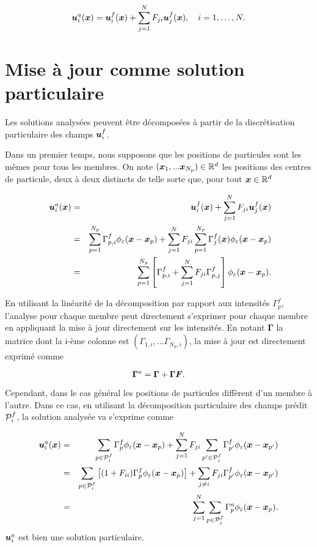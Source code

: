 \begin{equation}
    \bm{u}_i^a(\bm{x}) =\bm{u}_i^f(\bm{x}) + \sum_{j=1}^{N} F_{ji} \bm{u}_j ^f(\bm{x}), \quad i = 1, \dots, N.
\end{equation}

\section{Mise à jour comme solution particulaire}

Les solutions analysées peuvent être décomposées à partir de la discrétisation particulaire des champs $\bm{u}_i^f$.

Dans un premier temps, nous supposons que les positions de particules sont les mêmes pour tous les membres. On note $(\bm{x}_1,...\bm{x}_{N_p}) \in \mathbb{R}^d$ les positions des centres de particule, deux à deux distincts de telle sorte que, pour tout $\bm{x} \in \mathbb{R}^d$

\begin{eqnarray*}~\label{eq:enkf_formula_same_part}
    \bm{u}_i^a(\bm{x}) &=& \bm{u}_i^f(\bm{x}) + \sum_{j=1}^{N} F_{ji} \bm{u}_j ^f(\bm{x}) \\
    &=& \sum_{p=1}^{N_p} \Gamma^f_{p,i} \phi_{\varepsilon}(\bm{x} - \bm{x}_p) + \sum_{j=1}^{N} F_{ji} \sum_{p=1}^{N_p} \Gamma_j ^f(\bm{x}) \phi_{\varepsilon}(\bm{x} - \bm{x}_p) \\
    &=& \sum_{p=1}^{N_p} \left[\Gamma^f_{p,i} + \sum_{j=1}^{N} F_{ji} \Gamma^f_{p,j} \right] \phi_{\varepsilon}(\bm{x} - \bm{x}_p).
\end{eqnarray*}

En utilisant la linéarité de la décomposition par rapport aux intensités $\Gamma^f_{p}$, l'analyse pour chaque membre peut directement s'exprimer pour chaque membre en appliquant la mise à jour directement sur les intensités. En notant $\bm \Gamma$ la matrice dont la i-ème colonne est $(\Gamma_{1, i},...\Gamma_{N_p, i})$, la mise à jour est directement exprimé comme

\begin{equation*}
    \bm \Gamma^a = \bm \Gamma + \bm \Gamma \bm{F}.
\end{equation*}

Cependant, dans le cas général les positions de particules diffèrent d'un membre à l'autre. Dans ce cas, en utilisant la décomposition particulaire des champs prédit $\mathcal{P}_i^f$, la solution analysée va s'exprime comme

\begin{eqnarray*}
    \bm{u}_i^a(\bm{x}) &=& \sum_{p \in \mathcal{P}_i^f}\Gamma^f_p \phi_{\varepsilon}(\bm{x} - \bm{x}_p) + \sum_{j=1}^{N} F_{ji}  \sum_{p' \in \mathcal{P}_j^f}\Gamma^f_{p'} \phi_{\varepsilon}(\bm{x} - \bm{x}_{p'}) \\
    &=& \sum_{p \in \mathcal{P}_i^f}\left[(1 + F_{ii})\Gamma^f_p \phi_{\varepsilon}(\bm{x} - \bm{x}_{p})\right]   + \sum_{j\neq i} F_{ji} \Gamma^f_{p'} \phi_{\varepsilon}(\bm{x} - \bm{x}_{p'})\\
    &=& \sum_{j=1}^{N} \sum_{p \in \mathcal{P}_j^f} \Gamma^a_p \phi_{\varepsilon}(\bm{x} - \bm{x}_p).
\end{eqnarray*}
$\bm{u}_i^a$ est bien une solution particulaire.


